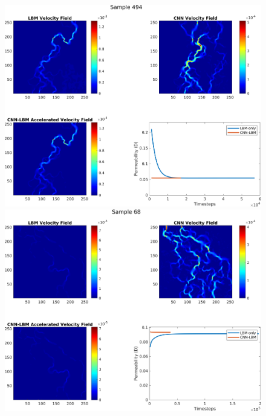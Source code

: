 \documentclass{article}
\begin{document}
\begin{figure}[htp!]
  \centering
  \begin{minipage}[b]{0.49\textwidth}
    \includegraphics[width=\textwidth]{figures/velAccCNNs494-6.png}
  \end{minipage}
  \hfill
  \begin{minipage}[b]{0.49\textwidth}
    \includegraphics[width=\textwidth]{figures/velAccCNNs68-6.png}
  \end{minipage}
    \begin{minipage}[b]{0.49\textwidth}

\end{minipage}
\end{figure}
\end{document}

